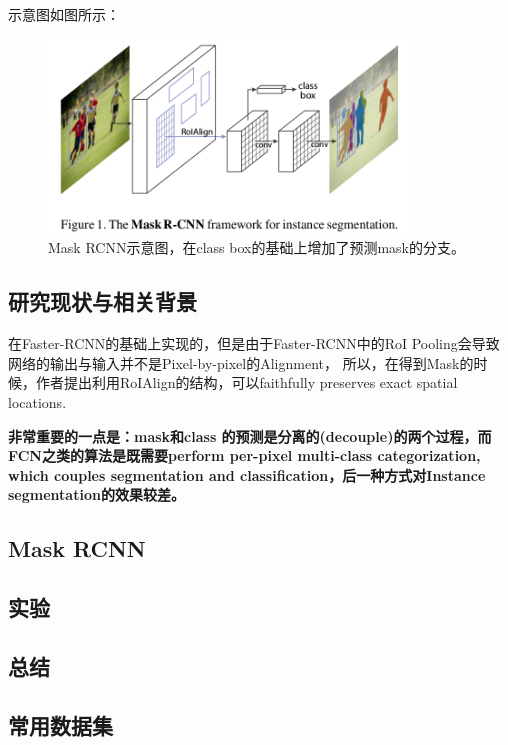 示意图如图所示：
\begin{figure}[!hbtp]
\centering
\includegraphics[width=0.85\textwidth]{SemanticSLAM/MaskRCNN0.png}
\caption{Mask RCNN示意图，在class box的基础上增加了预测mask的分支。}
\label{MaskRCNN0}
\end{figure}

\subsection{研究现状与相关背景}

在Faster-RCNN的基础上实现的，但是由于Faster-RCNN中的RoI Pooling会导致网络的输出与输入并不是Pixel-by-pixel的Alignment， 所以，在得到Mask的时候，作者提出利用RoIAlign的结构，可以faithfully preserves exact spatial locations.

{\bfseries 非常重要的一点是：mask和class 的预测是分离的(decouple)的两个过程，而FCN之类的算法是既需要perform per-pixel multi-class categorization, which couples segmentation and classification，后一种方式对Instance segmentation的效果较差。}


\subsection{Mask RCNN}


\subsection{实验}


\subsection{总结}





\subsection{常用数据集}

